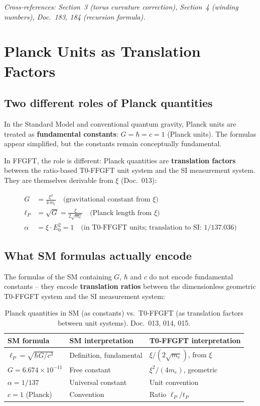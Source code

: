 \noindent\textit{Cross-references: Section~3 (torus curvature correction),
Section~4 (winding numbers), Doc.~183, 184 (recursion formula).}

\section{Planck Units as Translation Factors}

\subsection{Two different roles of Planck quantities}

In the Standard Model and conventional quantum gravity, Planck units
are treated as \textbf{fundamental constants}: $G = \hbar = c = 1$
(Planck units). The formulas appear simplified, but the constants
remain conceptually fundamental.

In FFGFT, the role is different: Planck quantities are
\textbf{translation factors} between the ratio-based T0-FFGFT unit system
and the SI measurement system. They are themselves derivable from
$\xi$ (Doc.~013):

\begin{align}
    G &= \frac{\xi^2}{4\,m_e}
    \quad \text{(gravitational constant from } \xi\text{)} \\[4pt]
    \ell_P &= \sqrt{G} = \frac{\xi}{2\sqrt{m_e}}
    \quad \text{(Planck length from } \xi\text{)} \\[4pt]
    \alpha &= \xi \cdot E_0^2 = 1
    \quad \text{(in T0-FFGFT units; translation to SI: } 1/137.036\text{)}
\end{align}

\subsection{What SM formulas actually encode}

The formulas of the SM containing $G$, $\hbar$ and $c$ do not encode
fundamental constants -- they encode \textbf{translation ratios}
between the dimensionless geometric T0-FFGFT system and the SI measurement
system:

\begin{table}[htbp]
\centering\small
\begin{tabular}{lll}
\toprule
\textbf{SM formula} & \textbf{SM interpretation} & \textbf{T0-FFGFT interpretation} \\
\midrule
$\ell_P = \sqrt{\hbar G/c^3}$ & Definition, fundamental & $\xi/(2\sqrt{m_e})$, from $\xi$ \\
$G = 6.674 \times 10^{-11}$   & Free constant           & $\xi^2/(4m_e)$, geometric \\
$\alpha = 1/137$               & Universal constant      & Unit convention \\
$c = 1$ (Planck)               & Convention              & Ratio $\ell_P/t_P$ \\
\bottomrule
\end{tabular}
\caption{Planck quantities in SM (as constants) vs.\ T0-FFGFT (as
translation factors between unit systems). Doc.~013, 014, 015.}
\label{tab:planck_translation_en}
\end{table}

